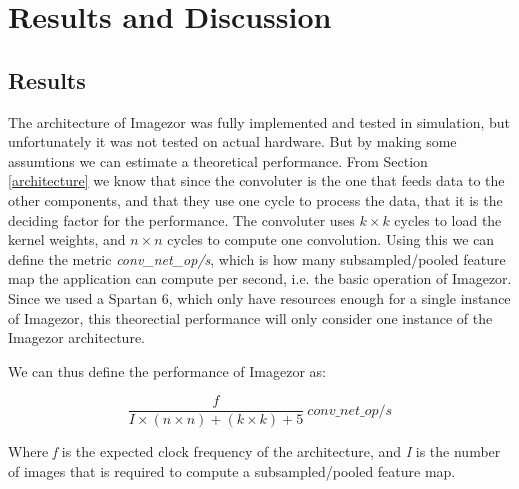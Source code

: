\chapter{Results and Discussion} \label{chap_results}

\section{Results}

The architecture of Imagezor was fully implemented and tested in simulation, but unfortunately it was not tested on actual hardware. But by making some assumtions we can estimate a theoretical performance. From Section \ref{architecture} we know that since the convoluter is the one that feeds data to the other components, and that they use one cycle to process the data, that it is the deciding factor for the performance. The convoluter uses $ k \times k $ cycles to load the kernel weights, and $ n \times n $ cycles to compute one convolution.  Using this we can define the metric \textit{conv\_net\_op/s}, which is how many subsampled/pooled feature map the application can compute per second, i.e. the basic operation of Imagezor. Since we used a Spartan 6, which only have resources enough for a single instance of Imagezor, this theorectial performance will only consider one instance of the Imagezor architecture.  

We can thus define the performance of Imagezor as:

\begin{equation} \label{eq_theoretical_performance}
\frac{f}{I\times(n \times n) + (k \times k) + 5} ~conv\_net\_op/s
\end{equation}

Where \textit{f} is the expected clock frequency of the architecture, and \textit{I} is the number of images that is required to compute a subsampled/pooled feature map. 

